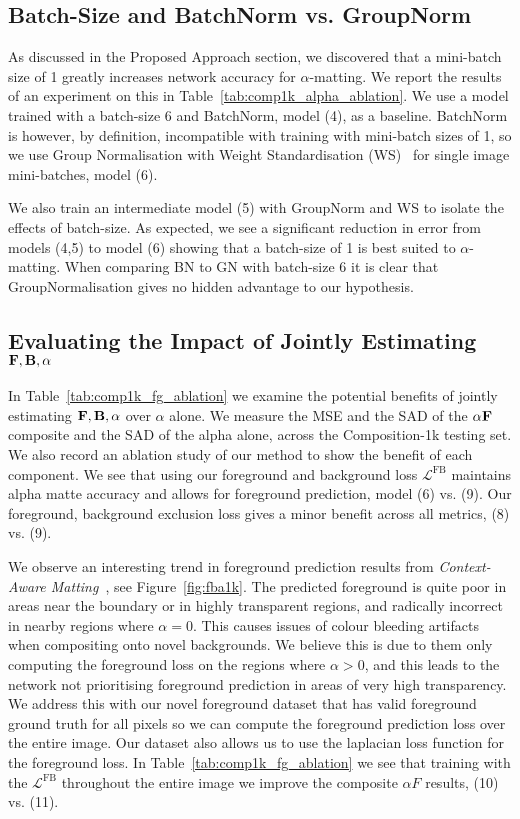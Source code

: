 \documentclass[runningheads]{llncs}
\begin{document}
\subsection{Batch-Size and BatchNorm vs. GroupNorm}

As discussed in the Proposed Approach section, we discovered that a mini-batch size of 1 greatly increases network accuracy for $\alpha$-matting. We report the results of an experiment on this in Table~\ref{tab:comp1k_alpha_ablation}. We use a model trained with a batch-size 6 and BatchNorm, model (4), as a baseline. BatchNorm is however, by definition, incompatible with training with mini-batch sizes of 1, so we use Group Normalisation with Weight Standardisation (WS)~\cite{groupnorm,weightstandardization} for single image mini-batches, model (6).

We also train an intermediate model (5) with GroupNorm and WS to isolate the effects of batch-size. As expected, we see a significant reduction in error from models (4,5) to model (6) showing that a batch-size of 1 is best suited to $\alpha$-matting. When comparing BN to GN with batch-size 6 it is clear that GroupNormalisation gives no hidden advantage to our hypothesis. 


\subsection{Evaluating the Impact of Jointly Estimating $\mathbf{{{F}}},\mathbf{{{B}}},\alpha$}

In Table~\ref{tab:comp1k_fg_ablation} we examine the potential benefits of jointly estimating $\mathbf{{{F}}},\mathbf{{{B}}},\alpha$ over $\alpha$ alone. We measure the MSE and the SAD of the $\alpha \mathbf{{{F}}}$ composite and the SAD of the alpha alone, across the Composition-1k testing set. We also record an ablation study of our method to show the benefit of each component. We see that using our foreground and background loss $\mathcal{L}^{\mathrm{FB}}$ maintains alpha matte accuracy and allows for foreground prediction, model (6) vs. (9). Our foreground, background exclusion loss gives a minor benefit across all metrics, (8) vs. (9).

We observe an interesting trend in foreground prediction results from \textit{Context-Aware Matting}~\cite{ContextMatting}, see Figure~\ref{fig:fba1k}. The predicted foreground is quite poor in areas near the boundary or in highly transparent regions, and radically incorrect in nearby regions where $\alpha=0$. This causes issues of colour bleeding artifacts when compositing onto novel backgrounds. We believe this is due to them only computing the foreground loss on the regions where $\alpha>0$, and this leads to the network not prioritising foreground prediction in areas of very high transparency. We address this with our novel foreground dataset that has valid foreground ground truth for all pixels so we can compute the foreground prediction loss over the entire image. Our dataset also allows us to use the laplacian loss function for the foreground loss. In Table~\ref{tab:comp1k_fg_ablation} we see that training with the $\mathcal{L}^{\mathrm{FB}}$ throughout the entire image we improve the composite $\alpha F$ results, (10) vs. (11). 
\end{document}
